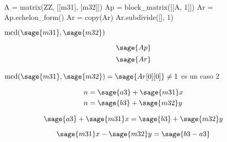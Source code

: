 \documentclass{amsart}
\begin{document}

\begin{sageblock}
	A = matrix(ZZ, [[m31], [m32]])
	Ap = block_matrix([[A, 1]])
	Ar = Ap.echelon_form()
	Ar = copy(Ar)
	Ar.subdivide([], 1)
\end{sageblock}

$\text{mcd}(\sage{m31}, \sage{m32})$

$$
	\sage{Ap}
$$
$$
	\sage{Ar}
$$

$\text{mcd}(\sage{m31}, \sage{m32}) = \sage{Ar[0][0]} \not= 1$ es un caso 2

\begin{align*}
	n &= \sage{a3} + \sage{m31} x \\
	n &= \sage{b3} + \sage{m32} y \\
\end{align*}

$$
	\sage{a3} + \sage{m31} x = \sage{b3} + \sage{m32} y
$$

$$
	\sage{m31} x - \sage{m32} y = \sage{b3 - a3}
$$




\end{document}
